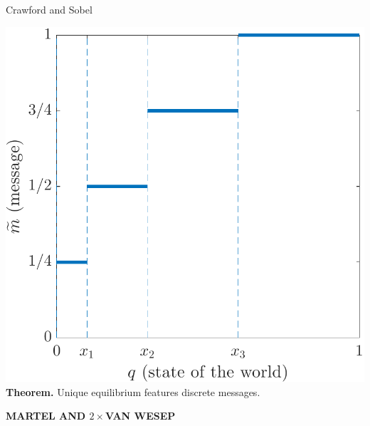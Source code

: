 \documentclass[hyperref={colorlinks=true,linkcolor=blue,citecolor=blue}]{beamer}
\begin{document}
\begin{frame}{Crawford and Sobel}
\begin{center}
\includegraphics[scale=.45]{CrawfordSobel}\\
\textbf{Theorem.} Unique equilibrium features discrete messages.
\end{center}
\end{frame}

\begin{frame}
\begin{center}
\textbf{MARTEL AND $2\times$VAN WESEP}
\end{center}
\end{frame}
\end{document}
